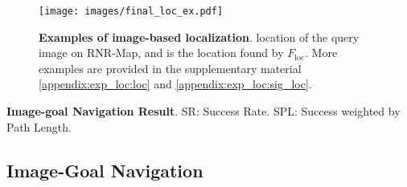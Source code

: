 \documentclass[10pt,twocolumn,letterpaper]{article}
\newcommand{\fullcircle}{\ding{108}}%
\newcommand{\starrr}{\ding{72}}%
\begin{document}
\begin{figure}
  \centering
  \texttt{[image: images/final\_loc\_ex.pdf]}
  \caption{\textbf{Examples of image-based localization}. {\color{RubineRed}\starrr} location of the query image on RNR-Map, and {\color{SeaGreen}\fullcircle} is the location found by  $F_\mathrm{loc}$. More examples are provided in the supplementary material \ref{appendix:exp_loc:loc} and \ref{appendix:exp_loc:sig_loc}.}
  \vspace{-0.3cm}
\label{fig:F_loc_example}
\end{figure}


\begin{table*}[t]
\centering
\resizebox{0.9\linewidth}{!}{%

}
\vspace{-0.2cm}
\caption{\textbf{Image-goal Navigation Result}. SR: Success Rate. SPL: Success weighted by Path Length.}
\vspace{-0.3cm}
\label{tab:nav}
\end{table*}


\begin{table}[t]
\centering
\resizebox{1.0\linewidth}{!}{%

}
\vspace{-0.2cm}
\caption{\textbf{Ablation study}. %
The values are the average of the straight and curved scenarios.}
\vspace{-0.3cm}
\label{tab:nav_ab}
\end{table}

\subsection{Image-Goal Navigation}
\end{document}
